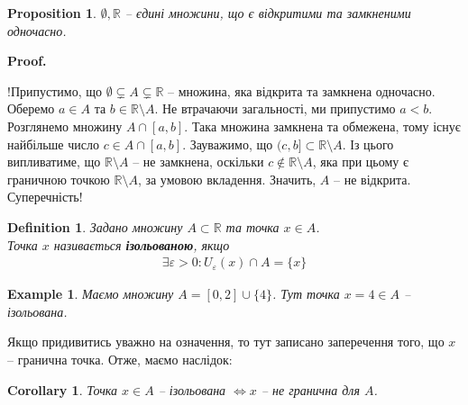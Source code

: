 \documentclass[a4paper, 14pt]{article}
\makeatletter
\def\qed{$\blacksquare$}
\theoremstyle{theoremdd}
\theoremstyle{theoremdd}
\newtheorem{definition}[theorem]{Definition}
\theoremstyle{theoremdd}
\theoremstyle{theoremdd}
\newtheorem{example}[theorem]{Example}
\theoremstyle{theoremdd}
\newtheorem{proposition}[theorem]{Proposition}
\theoremstyle{theoremdd}
\theoremstyle{theoremdd}
\theoremstyle{theoremdd}
\newtheorem{corollary}[theorem]{Corollary}
\renewenvironment{proof}[1][Proof.\\]{\par
\pushQED{\hfill \qed}%
\normalfont \topsep6\p@\@plus6\p@\relax
\trivlist
\item\relax
{\bfseries
#1\@addpunct{.}}\hspace\labelsep\ignorespaces
}{%
\popQED\endtrivlist\@endpefalse
}
\makeatother
\begin{document}
\begin{proposition}
$\emptyset, \mathbb{R}$ -- єдині множини, що є відкритими та замкненими одночасно.
\end{proposition}

\begin{proof}
!Припустимо, що $\emptyset \subsetneq A \subsetneq \mathbb{R}$ -- множина, яка відкрита та замкнена одночасно. Оберемо $a \in A$ та $b \in \mathbb{R} \setminus A$. Не втрачаючи загальності, ми припустимо $a < b$.\\
Розглянемо множину $A \cap [a,b]$. Така множина замкнена та обмежена, тому існує найбільше число $c \in A \cap [a,b]$. Зауважимо, що $(c,b] \subset \mathbb{R} \setminus A$. Із цього випливатиме, що $\mathbb{R} \setminus A$ -- не замкнена, оскільки $c \notin \mathbb{R} \setminus A$, яка при цьому є граничною точкою $\mathbb{R} \setminus A$, за умовою вкладення. Значить, $A$ -- не відкрита. Суперечність!
\end{proof}

\begin{definition}
Задано множину $A \subset \mathbb{R}$ та точка $x \in A$.\\
Точка $x$ називається \textbf{ізольованою}, якщо
\begin{align*}
\exists \varepsilon > 0: U_{\varepsilon}(x) \cap A = \{x\}
\end{align*}
\end{definition}

\begin{example}
Маємо множину $A = [0,2] \cup \{4\}$. Тут точка $x = 4 \in A$ -- ізольована.
\begin{figure}[H]
\centering
{}

\end{figure}
\end{example}

Якщо придивитись уважно на означення, то тут записано заперечення того, що $x$ -- гранична точка. Отже, маємо наслідок:

\begin{corollary}
Точка $x \in A$ -- ізольована $\iff x$ -- не гранична для $A$.
\end{corollary}
\end{document}
